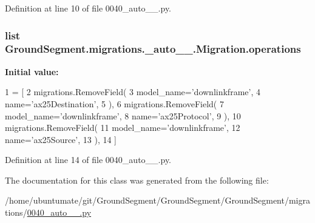 Definition at line 10 of file 0040\+\_\+auto\+\_\+\_.\+py.

\hypertarget{class_ground_segment_1_1migrations_1_10040__auto__20170131__2025_1_1_migration_a1aade2432b7396d1104432b10a466939}{}
\subsubsection[{operations}]{\setlength{\rightskip}{0pt plus 5cm}list Ground\+Segment.\+migrations.\+\_\+auto\+\_\+\_.\+Migration.\+operations\hspace{0.3cm}{\ttfamily [static]}}\label{class_ground_segment_1_1migrations_1_10040__auto__20170131__2025_1_1_migration_a1aade2432b7396d1104432b10a466939}
{\bfseries Initial value\+:}
\begin{DoxyCode}
1 = [
2         migrations.RemoveField(
3             model\_name=\textcolor{stringliteral}{'downlinkframe'},
4             name=\textcolor{stringliteral}{'ax25Destination'},
5         ),
6         migrations.RemoveField(
7             model\_name=\textcolor{stringliteral}{'downlinkframe'},
8             name=\textcolor{stringliteral}{'ax25Protocol'},
9         ),
10         migrations.RemoveField(
11             model\_name=\textcolor{stringliteral}{'downlinkframe'},
12             name=\textcolor{stringliteral}{'ax25Source'},
13         ),
14     ]
\end{DoxyCode}


Definition at line 14 of file 0040\+\_\+auto\+\_\+\_.\+py.



The documentation for this class was generated from the following file\+:\begin{DoxyCompactItemize}
\item 
/home/ubuntumate/git/\+Ground\+Segment/\+Ground\+Segment/\+Ground\+Segment/migrations/\hyperlink{0040__auto__20170131__2025_8py}{0040\+\_\+auto\+\_\+\_.\+py}\end{DoxyCompactItemize}

